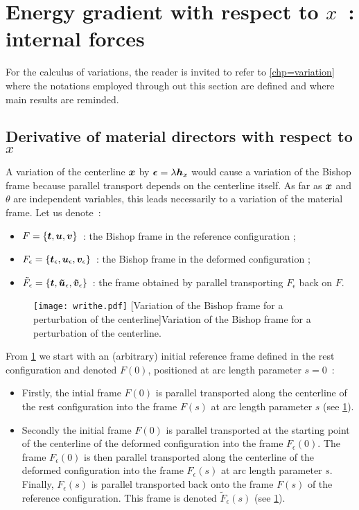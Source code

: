 \section{Energy gradient with respect to $x$~: internal forces}\label{sec=dE_dx}

For the calculus of variations, the reader is invited to refer to \cref{chp=variation} where the notations employed through out this section are defined and where main results are reminded.

\subsection{Derivative of material directors with respect to $x$}
A variation of the centerline $\boldsymbol{x}$ by $\boldsymbol{\epsilon} = \lambda \boldsymbol{h}_x$ would cause a variation of the Bishop frame because parallel transport depends on the centerline itself. As far as $\boldsymbol{x}$ and $\theta$ are independent variables, this leads necessarily to a variation of the material frame. Let us denote~:
\begin{itemize}
\item
$F = \{\boldsymbol{t}, \boldsymbol{u},\boldsymbol{v}\}$~: the Bishop frame in the reference configuration ;
\item
 $F_\epsilon = \{\boldsymbol{t}_\epsilon, \boldsymbol{u}_\epsilon,\boldsymbol{v}_\epsilon\}$~: the Bishop frame in the deformed configuration ;
 \item
$\tilde{F}_\epsilon = \{\boldsymbol{t}, \boldsymbol{\tilde{u}}_\epsilon,\boldsymbol{\tilde{v}}_\epsilon\}$~: the frame obtained by parallel transporting $F_\epsilon$ back on $F$.
\end{itemize}
\begin{figure}[p]
\begin{fullpage}
\centering
\texttt{[image: writhe.pdf]}
[Variation of the Bishop frame for a perturbation of the centerline]{Variation of the Bishop frame for a perturbation of the centerline.}
\label{fig:varbishop}
\end{fullpage}
\end{figure}
From \cref{fig:varbishop} we start with an (arbitrary) initial reference frame defined in the rest configuration and denoted $F(0)$, positioned at arc length parameter $s=0$~:
\begin{itemize}
\item
Firstly, the intial frame $F(0)$ is parallel transported along the centerline of the rest configuration into the frame $F(s)$ at arc length parameter $s$ (see \cref{fig:varbishop}).
\item
Secondly the initial frame $F(0)$ is parallel transported at the starting point of the centerline of the deformed configuration into the frame $F_{\epsilon}(0)$. The frame $F_{\epsilon}(0)$ is then parallel transported along the centerline of the deformed configuration into the frame $F_{\epsilon}(s)$ at arc length parameter $s$. Finally, $F_{\epsilon}(s)$ is parallel transported back onto the frame $F(s)$ of the reference configuration. This frame is denoted $\tilde{F}_\epsilon(s)$ (see \cref{fig:varbishop}).
\end{itemize}
